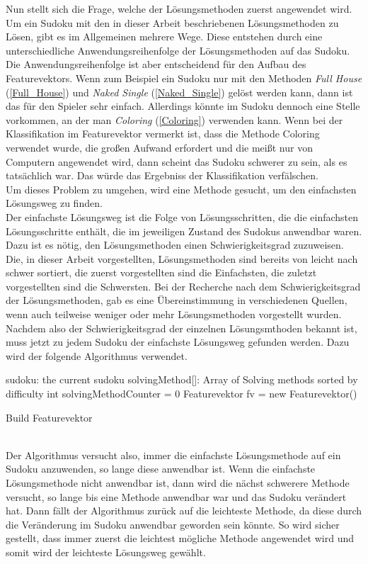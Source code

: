 Nun stellt sich die Frage, welche der Lösungsmethoden zuerst angewendet wird. Um ein Sudoku mit den in dieser Arbeit beschriebenen Lösungsmethoden zu Lösen, gibt es im Allgemeinen mehrere Wege. Diese entstehen durch eine unterschiedliche Anwendungsreihenfolge der Lösungsmethoden auf das Sudoku. Die Anwendungsreihenfolge ist aber entscheidend für den Aufbau des Featurevektors. Wenn zum Beispiel ein Sudoku nur mit den Methoden \textit{Full House} (\ref{Full_House}) und \textit{Naked Single} (\ref{Naked_Single}) gelöst werden kann, dann ist das für den Spieler sehr einfach. Allerdings könnte im Sudoku dennoch eine Stelle vorkommen, an der man \textit{Coloring} (\ref{Coloring}) verwenden kann. Wenn bei der Klassifikation im Featurevektor vermerkt ist, dass die Methode Coloring verwendet wurde, die großen Aufwand erfordert und die meißt nur von Computern angewendet wird, dann scheint das Sudoku schwerer zu sein, als es tatsächlich war. Das würde das Ergebniss der Klassifikation verfälschen.\\
Um dieses Problem zu umgehen, wird eine Methode gesucht, um den einfachsten Lösungsweg zu finden.\\
Der einfachste Lösungsweg ist die Folge von Lösungsschritten, die die einfachsten Lösungsschritte enthält, die im jeweiligen Zustand des Sudokus anwendbar waren. Dazu ist es nötig, den Lösungsmethoden einen Schwierigkeitsgrad zuzuweisen. \\
Die, in dieser Arbeit vorgestellten, Lösungsmethoden sind bereits von leicht nach schwer sortiert, die zuerst vorgestellten sind die Einfachsten, die zuletzt vorgestellten sind die Schwersten. Bei der Recherche nach dem Schwierigkeitsgrad der Lösungsmethoden, gab es eine Übereinstimmung in verschiedenen Quellen, wenn auch teilweise weniger oder mehr Lösungsmethoden vorgestellt wurden.\cite{diff1}\cite{diff4}\cite{diff2}\cite{diff3}\\
Nachdem also der Schwierigkeitsgrad der einzelnen Lösungsmthoden bekannt ist, muss jetzt zu jedem Sudoku der einfachste Lösungsweg gefunden werden. Dazu wird der folgende Algorithmus verwendet.\\

\begin{algorithm}[H]
 sudoku: the current sudoku\;
 solvingMethod[]: Array of Solving methods sorted by difficulty\;
 int solvingMethodCounter = 0\;
 Featurevektor fv = new Featurevektor()\;
 \caption{Build Featurevektor}
\end{algorithm}
\mbox{} \\
Der Algorithmus versucht also, immer die einfachste Lösungsmethode auf ein Sudoku anzuwenden, so lange diese anwendbar ist. Wenn die einfachste Lösungsmethode nicht anwendbar ist, dann wird die nächst schwerere Methode versucht, so lange bis eine Methode anwendbar war und das Sudoku verändert hat. Dann fällt der Algorithmus zurück auf die leichteste Methode, da diese durch die Veränderung im Sudoku anwendbar geworden sein könnte. So wird sicher gestellt, dass immer zuerst die leichtest mögliche Methode angewendet wird und somit wird der leichteste Lösungsweg gewählt.